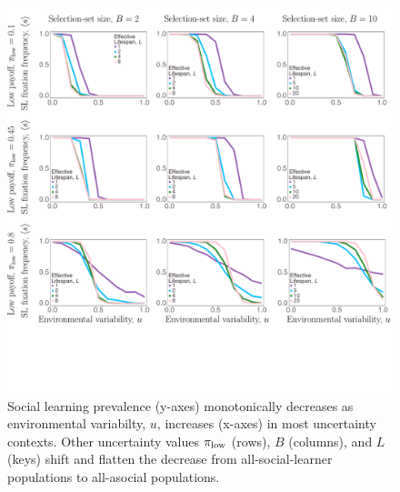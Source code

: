 \documentclass[letterpaper,11.5pt]{scrartcl}
\begin{document}
\begin{figure}
  \caption{Social learning prevalence (y-axes) monotonically decreases as 
  environmental variabilty, $u$, increases (x-axes) in most uncertainty contexts. 
  Other uncertainty values $\pi_{\mathrm{low}}$ (rows), $B$ (columns), and $L$ (keys)
  shift and flatten the decrease from all-social-learner populations to all-asocial 
  populations.}
  \label{fig:mainResults}
  \centering
    \includegraphics[width=\textwidth]{Figures/mainResultsPlots.pdf}
\end{figure}
\end{document}
